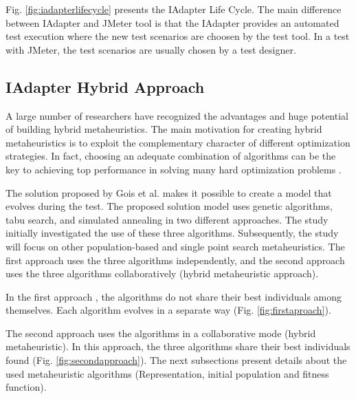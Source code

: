 Fig. \ref{fig:iadapterlifecycle} presents the IAdapter Life Cycle. The main difference between IAdapter and JMeter tool is that the IAdapter provides an automated test execution where the new test scenarios are choosen by the test tool.  In a test with JMeter, the test scenarios are usually chosen by a test designer.


\subsection{IAdapter Hybrid Approach}

A large number of researchers have recognized the advantages and huge potential of building hybrid metaheuristics. The main motivation for creating hybrid metaheuristics is to exploit the complementary character of different optimization strategies. In fact, choosing an adequate combination of algorithms can be the key to achieving top performance in solving many hard optimization problems \citep{Puchinger2005} \citep{Blum2012}.

The solution proposed by Gois et al. \citep{Gois2016} makes it possible to create a model that evolves during the test. The proposed solution model uses genetic algorithms, tabu search, and simulated annealing in two different approaches. The study initially investigated the use of these three algorithms. Subsequently, the study will focus on other population-based and single point search metaheuristics. The first approach uses the three algorithms independently, and the second approach uses the three algorithms collaboratively (hybrid metaheuristic approach).

In the first approach , the algorithms do not share their best individuals among themselves. Each algorithm evolves in a separate way (Fig. \ref{fig:firstaproach}).





The second approach uses the algorithms in a collaborative mode (hybrid metaheuristic). In this approach, the three algorithms share their best individuals found (Fig. \ref{fig:secondapproach}). The next subsections present details about the used metaheuristic algorithms (Representation, initial population and fitness function).


